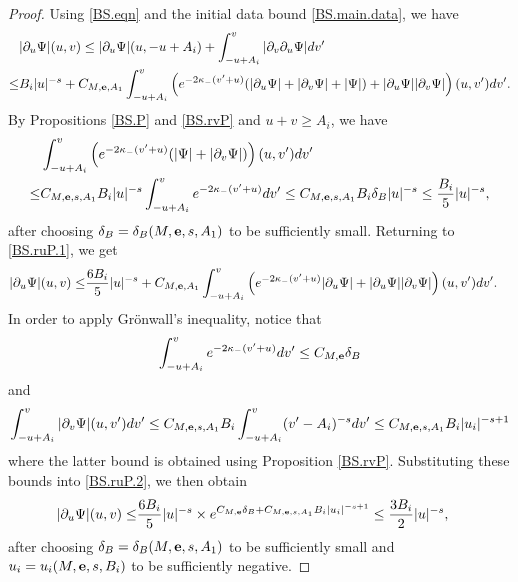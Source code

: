 \documentclass[10pt, reqno]{amsart}
\theoremstyle{definition}
\theoremstyle{remark}
\numberwithin{equation}{section}
\newcommand{\rd}{\partial}
\newcommand{\0}{\emptyset}
\newcommand{\f}{\frac}
\newcommand{\de}{\delta}
\begin{document}
\begin{proof}
Using \eqref{BS.eqn} and the initial data bound \eqref{BS.main.data}, we have
\begin{equation}\label{BS.ruP.1}
\begin{split}
&|\rd_u\Psi|(u,v)\leq |\rd_u\Psi|(u,-u+A_i)+\int_{-u+A_i}^v |\rd_v\rd_u\Psi| dv'\\
\leq &B_i|u|^{-s}+C_{M,{\bf e},A_1}\int_{-u+A_i}^v \left(e^{-2\kappa_-(v'+u)}(|\rd_u\Psi|+|\rd_v\Psi|+|\Psi|)+|\rd_u\Psi||\rd_v\Psi|\right)(u,v') dv'.
\end{split}
\end{equation}
By Propositions \ref{BS.P} and \ref{BS.rvP} and $u+v\geq A_i$, we have
\begin{equation*}
\begin{split}
&\int_{-u+A_i}^v \left(e^{-2\kappa_-(v'+u)}(| \Psi |+|\rd_v\Psi|)\right)(u,v') dv'\\
\leq &C_{M,{\bf e},s,A_1}B_i|u|^{-s}\int_{-u+A_i}^v e^{-2\kappa_- (v'+u)} dv'\leq C_{M,{\bf e},s,A_1}B_i\de_B |u|^{-s}\leq \f{B_i}{5}|u|^{-s},
\end{split}
\end{equation*}
after choosing $\delta_B=\delta_B(M,{\bf e},s,A_1)$ to be sufficiently small.
Returning to \eqref{BS.ruP.1}, we get
\begin{equation}\label{BS.ruP.2}
\begin{split}
|\rd_u\Psi|(u,v)\leq &\f{6B_i}{5}|u|^{-s}
+C_{M,{\bf e},A_1}\int_{-u+A_i}^v \left(e^{-2\kappa_-(v'+u)}|\rd_u\Psi|+|\rd_u\Psi||\rd_v\Psi|\right)(u,v') dv'.
\end{split}
\end{equation}
In order to apply Gr\"onwall's inequality, notice that
$$\int_{-u+A_i}^v e^{-2\kappa_-(v'+u)} dv'\leq C_{M,{\bf e}}\de_B$$
and
$$\int_{-u+A_i}^v |\rd_v\Psi|(u,v') dv'\leq C_{M,{\bf e},s,A_1}B_i\int_{-u+A_i}^v (v'-A_i)^{-s} d v' \leq C_{M,{\bf e},s,A_1}B_i|u_i|^{-s+1}$$
where the latter bound is obtained using Proposition \ref{BS.rvP}. Substituting these bounds into \eqref{BS.ruP.2}, we then obtain
\begin{equation*}
\begin{split}
|\rd_u\Psi|(u,v)\leq &\f{6B_i}{5}|u|^{-s}\times e^{C_{M,{\bf e}}\de_B+C_{M,{\bf e},s,A_1}B_i|u_i|^{-s+1}}\leq \f{3B_i}{2}|u|^{-s},
\end{split}
\end{equation*}
after choosing $\delta_B=\delta_B(M,{\bf e},s,A_1)$ to be sufficiently small and $u_i=u_i(M,{\bf e},s,B_i)$ to be sufficiently negative.
\end{proof}
\end{document}
